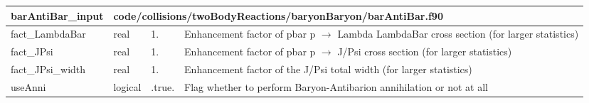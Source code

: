 \documentclass{article}
\begin{document}
\begin{longtable}{llll}
\toprule
\textbf{\large{barAntiBar\_input}} & \multicolumn{3}{l}{\footnotesize{code/collisions/twoBodyReactions/baryonBaryon/barAntiBar.f90}}\\*
\midrule
\endfirsthead
\midrule
\endhead
fact\_LambdaBar & \begin{minipage}[t]{2cm}real\end{minipage} & \begin{minipage}[t]{2cm}1.\end{minipage} & \begin{minipage}[t]{12cm}Enhancement factor of pbar p $\rightarrow$ Lambda LambdaBar cross section (for larger statistics)\end{minipage}\\*
\midrule
fact\_JPsi & \begin{minipage}[t]{2cm}real\end{minipage} & \begin{minipage}[t]{2cm}1.\end{minipage} & \begin{minipage}[t]{12cm}Enhancement factor of pbar p $\rightarrow$ J/Psi cross section (for larger statistics)\end{minipage}\\*
\midrule
fact\_JPsi\_width & \begin{minipage}[t]{2cm}real\end{minipage} & \begin{minipage}[t]{2cm}1.\end{minipage} & \begin{minipage}[t]{12cm}Enhancement factor of the J/Psi total width (for larger statistics)\end{minipage}\\*
\midrule
useAnni & \begin{minipage}[t]{2cm}logical\end{minipage} & \begin{minipage}[t]{2cm}.true.\end{minipage} & \begin{minipage}[t]{12cm}Flag whether to perform Baryon-Antibarion annihilation or not at all\end{minipage}\\*
\bottomrule
\end{longtable}
{ }



\end{document}
